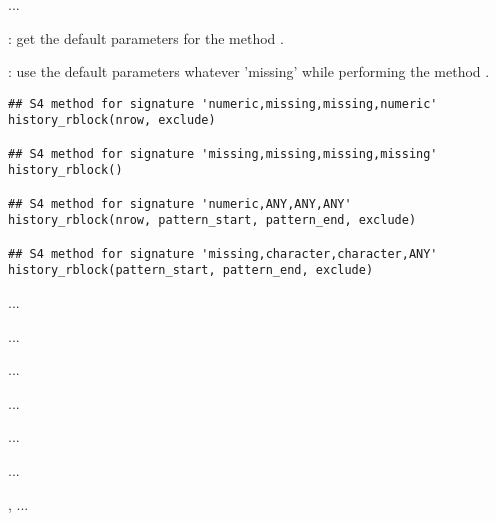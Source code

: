 \documentclass[letterpaper]{book}
\begin{document}
%
\begin{Description}\relax
...

: get the default parameters for the method
.

: use the default parameters whatever 'missing'
while performing the method .
\end{Description}
%
\begin{Usage}
\begin{verbatim}
## S4 method for signature 'numeric,missing,missing,numeric'
history_rblock(nrow, exclude)

## S4 method for signature 'missing,missing,missing,missing'
history_rblock()

## S4 method for signature 'numeric,ANY,ANY,ANY'
history_rblock(nrow, pattern_start, pattern_end, exclude)

## S4 method for signature 'missing,character,character,ANY'
history_rblock(pattern_start, pattern_end, exclude)
\end{verbatim}
\end{Usage}
%
\begin{Arguments}
\begin{ldescription}
\item[\code{nrow}] ...

\item[\code{exclude}] ...

\item[\code{pattern\_start}] ...

\item[\code{pattern\_end}] ...
\end{ldescription}
\end{Arguments}
%
\begin{Details}\relax
...
\end{Details}
%
\begin{Value}
...
\end{Value}
%
\begin{SeeAlso}\relax
{}, ...
\end{SeeAlso}
\end{document}
